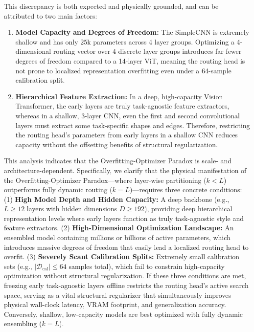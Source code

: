 This discrepancy is both expected and physically grounded, and can be attributed to two main factors:
\begin{enumerate}
    \item \textbf{Model Capacity and Degrees of Freedom:} The SimpleCNN is extremely shallow and has only $25$k parameters across 4 layer groups. Optimizing a 4-dimensional routing vector over 4 discrete layer groups introduces far fewer degrees of freedom compared to a 14-layer ViT, meaning the routing head is not prone to localized representation overfitting even under a 64-sample calibration split.
    \item \textbf{Hierarchical Feature Extraction:} In a deep, high-capacity Vision Transformer, the early layers are truly task-agnostic feature extractors, whereas in a shallow, 3-layer CNN, even the first and second convolutional layers must extract some task-specific shapes and edges. Therefore, restricting the routing head's parameters from early layers in a shallow CNN reduces capacity without the offsetting benefits of structural regularization.
\end{enumerate}
This analysis indicates that the Overfitting-Optimizer Paradox is scale- and architecture-dependent. Specifically, we clarify that the physical manifestation of the Overfitting-Optimizer Paradox—where layer-wise partitioning ($k < L$) outperforms fully dynamic routing ($k = L$)—requires three concrete conditions: (1) \textbf{High Model Depth and Hidden Capacity:} A deep backbone (e.g., $L \ge 12$ layers with hidden dimensions $D \ge 192$), providing deep hierarchical representation levels where early layers function as truly task-agnostic style and feature extractors. (2) \textbf{High-Dimensional Optimization Landscape:} An ensembled model containing millions or billions of active parameters, which introduces massive degrees of freedom that easily lead a localized routing head to overfit. (3) \textbf{Severely Scant Calibration Splits:} Extremely small calibration sets (e.g., $|\mathcal{D}_{\text{cal}}| \le 64$ samples total), which fail to constrain high-capacity optimization without structural regularization. If these three conditions are met, freezing early task-agnostic layers offline restricts the routing head's active search space, serving as a vital structural regularizer that simultaneously improves physical wall-clock latency, VRAM footprint, and generalization accuracy. Conversely, shallow, low-capacity models are best optimized with fully dynamic ensembling ($k=L$).

